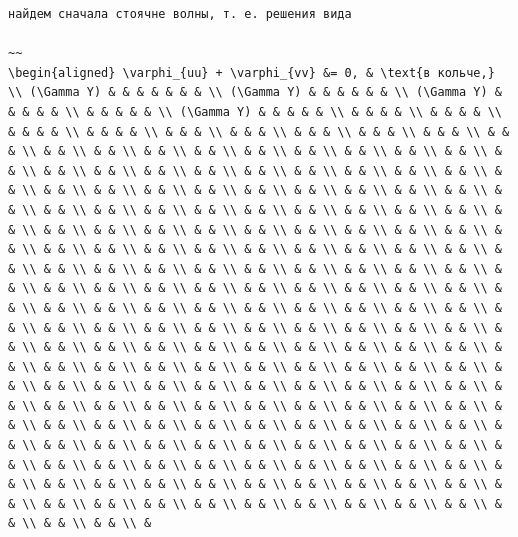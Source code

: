\documentclass[
  ukrainian,
]{article}
\begin{document}
\begin{verbatim}
найдем сначала стоячне волны, т. е. решения вида

~~
\begin{aligned} \varphi_{uu} + \varphi_{vv} &= 0, & \text{в кольче,} \\ (\Gamma Y) & & & & & & & \\ (\Gamma Y) & & & & & & \\ (\Gamma Y) & & & & & \\ & & & & & \\ (\Gamma Y) & & & & & \\ & & & & \\ & & & & \\ & & & & \\ & & & & \\ & & & \\ & & & \\ & & & \\ & & & \\ & & & \\ & & & \\ & & \\ & & \\ & & \\ & & \\ & & \\ & & \\ & & \\ & & \\ & & \\ & & \\ & & \\ & & \\ & & \\ & & \\ & & \\ & & \\ & & \\ & & \\ & & \\ & & \\ & & \\ & & \\ & & \\ & & \\ & & \\ & & \\ & & \\ & & \\ & & \\ & & \\ & & \\ & & \\ & & \\ & & \\ & & \\ & & \\ & & \\ & & \\ & & \\ & & \\ & & \\ & & \\ & & \\ & & \\ & & \\ & & \\ & & \\ & & \\ & & \\ & & \\ & & \\ & & \\ & & \\ & & \\ & & \\ & & \\ & & \\ & & \\ & & \\ & & \\ & & \\ & & \\ & & \\ & & \\ & & \\ & & \\ & & \\ & & \\ & & \\ & & \\ & & \\ & & \\ & & \\ & & \\ & & \\ & & \\ & & \\ & & \\ & & \\ & & \\ & & \\ & & \\ & & \\ & & \\ & & \\ & & \\ & & \\ & & \\ & & \\ & & \\ & & \\ & & \\ & & \\ & & \\ & & \\ & & \\ & & \\ & & \\ & & \\ & & \\ & & \\ & & \\ & & \\ & & \\ & & \\ & & \\ & & \\ & & \\ & & \\ & & \\ & & \\ & & \\ & & \\ & & \\ & & \\ & & \\ & & \\ & & \\ & & \\ & & \\ & & \\ & & \\ & & \\ & & \\ & & \\ & & \\ & & \\ & & \\ & & \\ & & \\ & & \\ & & \\ & & \\ & & \\ & & \\ & & \\ & & \\ & & \\ & & \\ & & \\ & & \\ & & \\ & & \\ & & \\ & & \\ & & \\ & & \\ & & \\ & & \\ & & \\ & & \\ & & \\ & & \\ & & \\ & & \\ & & \\ & & \\ & & \\ & & \\ & & \\ & & \\ & & \\ & & \\ & & \\ & & \\ & & \\ & & \\ & & \\ & & \\ & & \\ & & \\ & & \\ & & \\ & & \\ & & \\ & & \\ & & \\ & & \\ & & \\ & & \\ & & \\ & & \\ & & \\ & & \\ & & \\ & & \\ & & \\ & & \\ & & \\ & & \\ & & \\ & & \\ &
\end{verbatim}
\end{document}
